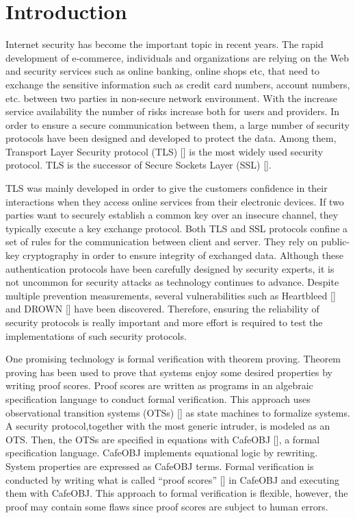\documentclass[a4paper,fleqn]{cas-dc}
\begin{document}
\maketitle

\section{Introduction}\label{intro}
Internet security has become the important topic in recent years. The rapid development of e-commerce, individuals and organizations are relying on the Web and security services such as online banking, online shops etc, that need to exchange the sensitive information such as credit card numbers, account numbers, etc. between two parties in non-secure network environment. With the increase service availability the number of risks increase both for users and providers. In order to ensure a secure communication between them, a large number of security protocols have been designed and developed to protect the data. Among them, Transport Layer Security protocol (TLS) [\cite{dierk}] is the most widely used security protocol. TLS is the successor of Secure Sockets Layer (SSL) [\cite{1621007}]. 

TLS was mainly developed in order to give the customers
confidence in their interactions when they access online services
from their electronic devices. If two parties want to securely establish a common key over an insecure channel, they typically execute a key exchange protocol. Both TLS and SSL protocols confine a set of rules for the communication between client and server. They rely on public-key cryptography in order to ensure integrity of exchanged data. Although  these  authentication  protocols  have been carefully designed by security experts, it is not uncommon for security attacks  as  technology  continues  to  advance. Despite multiple prevention measurements, several vulnerabilities such as  
Heartbleed [\cite{10.1145/2663716.2663755}] and DROWN [\cite{197245}] have been discovered. Therefore, ensuring the reliability of security protocols is really important and more effort is required to test the implementations of such security protocols.

One promising technology is formal verification  with theorem  proving. Theorem proving has been used to prove that systems enjoy some desired properties by writing proof scores. Proof scores are written as programs in an algebraic specification language to conduct formal verification. This approach uses observational transition systems (OTSs) [\cite{OgataF03fmoods}] as state machines to formalize systems. A security protocol,together with the most generic intruder, is modeled as an OTS. Then, the OTSs are specified in equations with CafeOBJ [\cite{DiaconescuF98amast}], a formal specification language. CafeOBJ implements equational logic by rewriting. System properties are expressed as CafeOBJ terms. Formal verification is conducted by writing what is called ``proof scores'' [\cite{OgataF03fmoods}] in CafeOBJ and executing them with CafeOBJ. This approach to formal verification is flexible, however, the proof may contain some flaws since proof scores are subject to human errors. 
\end{document}
